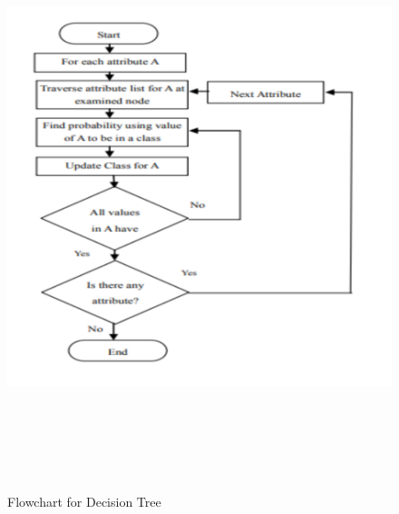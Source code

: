 \documentclass{book}
\begin{document}
    		\begin{figure}
    		\begin{center}
    			\includegraphics[height=17cm]{images/decision_tree.png}
    			\caption{Flowchart for Decision Tree}
    		\end{center}
    	\end{figure}
    
    	
\end{document}
